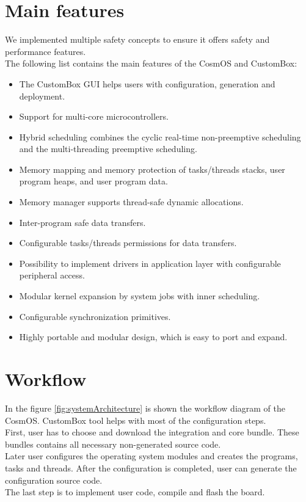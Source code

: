 \section{Main features}
We implemented multiple safety concepts to ensure it offers safety and performance features.\\
\indent The following list contains the main features of the CosmOS and CustomBox:
\begin{itemize}
\vspace{-0.2cm}\item The CustomBox \ac{GUI} helps users with configuration, generation and deployment.
\vspace{-0.2cm}\item Support for multi-core microcontrollers.
\vspace{-0.2cm}\item Hybrid scheduling combines the cyclic real-time non-preemptive scheduling and the multi-threading preemptive scheduling.
\vspace{-0.2cm}\item Memory mapping and memory protection of tasks/threads stacks, user program heaps, and user program data.
\vspace{-0.2cm}\item Memory manager supports thread-safe dynamic allocations.
\vspace{-0.2cm}\item Inter-program safe data transfers.
\vspace{-0.2cm}\item Configurable tasks/threads permissions for data transfers.
\vspace{-0.2cm}\item Possibility to implement drivers in application layer with configurable peripheral access.
\vspace{-0.2cm}\item Modular kernel expansion by system jobs with inner scheduling.
\vspace{-0.2cm}\item Configurable synchronization primitives.
\vspace{-0.2cm}\item Highly portable and modular design, which is easy to port and expand.
\end{itemize}


\section{Workflow}
In the figure \ref{fig:systemArchitecture} is shown the workflow diagram of the CosmOS. CustomBox tool helps with most of the configuration steps.\\
\indent First, user has to choose and download the integration and core bundle. These bundles contains all necessary non-generated source code.\\
\indent Later user configures the operating system modules and creates the programs, tasks and threads. After the configuration is completed, user can generate the configuration source code. \\
\indent The last step is to implement user code, compile and flash the board.

